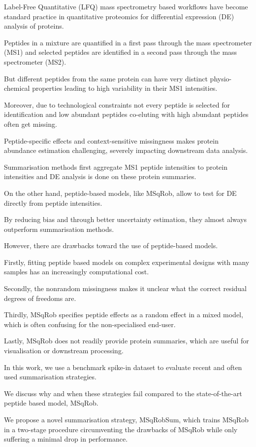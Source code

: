{Label-Free Quantitative (LFQ) mass spectrometry based workflows have become standard practice in quantitative proteomics for differential expression (DE) analysis of proteins.

Peptides in a mixture are quantified in a first pass through the mass spectrometer (MS1) and selected peptides are identified in a second pass through the mass spectrometer (MS2).

But different peptides from the same protein can have very distinct physio-chemical properties leading to high variability in their MS1 intensities.

Moreover, due to technological constraints not every peptide is selected for identification and low abundant peptides co-eluting with high abundant peptides often get missing.

Peptide-specific effects and context-sensitive missingness makes protein abundance estimation challenging, severely impacting downstream data analysis.

Summarisation methods first aggregate MS1 peptide intensities to protein intensities and DE analysis is done on these protein summaries.

On the other hand, peptide-based models, like MSqRob, allow to test for DE directly from peptide intensities.

By reducing bias and through better uncertainty estimation, they almost always outperform summarisation methods.

However, there are drawbacks toward the use of peptide-based models.

Firstly, fitting peptide based models on complex experimental designs with many samples has an increasingly computational cost.

Secondly, the nonrandom missingness makes it unclear what the correct residual degrees of freedoms are.

Thirdly, MSqRob specifies peptide effects as a random effect in a mixed model, which is often confusing for the non-specialised end-user.

Lastly, MSqRob does not readily provide protein summaries, which are useful for visualisation or downstream processing.

In this work, we use a benchmark spike-in dataset to evaluate recent and often used summarisation strategies.

We discuss why and when these strategies fail compared to the state-of-the-art peptide based model, MSqRob.

We propose a novel summarisation strategy, MSqRobSum, which trains MSqRob in a two-stage procedure circumventing the drawbacks of MSqRob while only suffering a minimal drop in performance.

}
